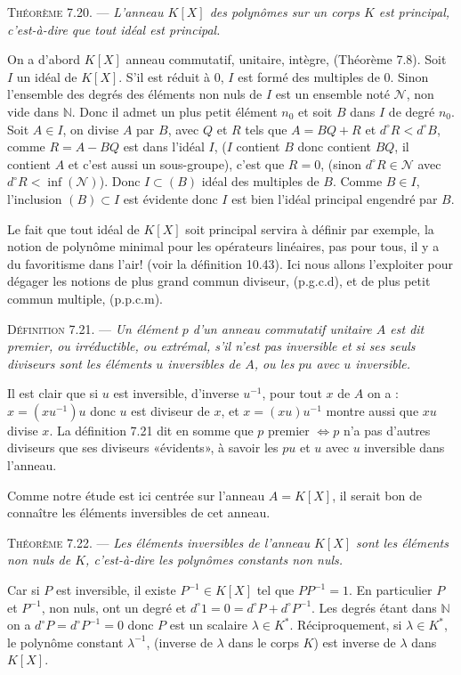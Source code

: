 \medskip\noindent\textsc{Théorème 7.20.} --- \emph{L'anneau $K[X]$ des polynômes sur un corps $K$ est principal, c'est-à-dire que tout idéal est principal.}

On a d'abord $K[X]$ anneau commutatif, unitaire, intègre, (Théorème 7.8). Soit $I$ un idéal de $K[X]$. S'il est réduit à 0, $I$ est formé des multiples de 0. Sinon l'ensemble des degrés des éléments non nuls de $I$ est un ensemble noté $\mathcal N$, non vide dans $\mathbb N$. Donc il admet un plus petit élément $n_0$ et soit $B$ dans $I$ de degré $n_0$. Soit $A\in I$, on divise $A$ par $B$, avec $Q$ et $R$ tels que $A=BQ+R$ et $d^\circ R<d^\circ B$, comme $R=A-BQ$ est dans l'idéal $I$, ($I$ contient $B$ donc contient $BQ$, il contient $A$ et c'est aussi un sous-groupe), c'est que $R=0$, (sinon $d^\circ R\in\mathcal N$ avec $d^\circ R<\inf(\mathcal N)$). Donc $I\subset(B)$ idéal des multiples de $B$. Comme $B\in I$, l'inclusion $(B)\subset I$ est évidente donc $I$ est bien l'idéal principal engendré par $B$. \bookend

Le fait que tout idéal de $K[X]$ soit principal servira à définir par exemple, la notion de polynôme minimal pour les opérateurs linéaires, pas pour tous, il y a du favoritisme dans l'air! (voir la définition 10.43). Ici nous allons l'exploiter pour dégager les notions de plus grand commun diviseur, (p.g.c.d), et de plus petit commun multiple, (p.p.c.m).

\medskip\noindent\textsc{Définition 7.21.} --- \emph{Un élément $p$ d'un anneau commutatif unitaire $A$ est dit premier, ou irréductible, ou extrémal, s'il n'est pas inversible et si ses seuls diviseurs sont les éléments $u$ inversibles de $A$, ou les $pu$ avec $u$ inversible.}

Il est clair que si $u$ est inversible, d'inverse $u^{-1}$, pour tout $x$ de $A$ on a : $x=(xu^{-1})u$ donc $u$ est diviseur de $x$, et $x=(xu)u^{-1}$ montre aussi que $xu$ divise $x$. La définition 7.21 dit en somme que $p$ premier $\Longleftrightarrow p$ n'a pas d'autres diviseurs que ses diviseurs «évidents», à savoir les $pu$ et $u$ avec $u$ inversible dans l'anneau.

Comme notre étude est ici centrée sur l'anneau $A=K[X]$, il serait bon de connaître les éléments inversibles de cet anneau.

\medskip\noindent\textsc{Théorème 7.22.} --- \emph{Les éléments inversibles de l'anneau $K[X]$ sont les éléments non nuls de $K$, c'est-à-dire les polynômes constants non nuls.}

Car si $P$ est inversible, il existe $P^{-1}\in K[X]$ tel que $PP^{-1}=1$. En particulier $P$ et $P^{-1}$, non nuls, ont un degré et $d^\circ1=0=d^\circ P+d^\circ P^{-1}$. Les degrés étant dans $\mathbb N$ on a $d^\circ P=d^\circ P^{-1}=0$ donc $P$ est un scalaire $\lambda\in K^*$. Réciproquement, si $\lambda\in K^*$, le polynôme constant $\lambda^{-1}$, (inverse de $\lambda$ dans le corps $K$) est inverse de $\lambda$ dans $K[X]$. \bookend

